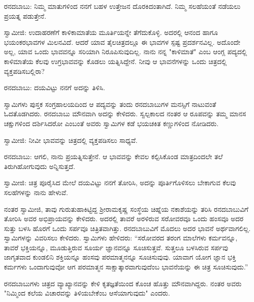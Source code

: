 ರನದಬಾಬು: ನಿಮ್ಮ ಮಾತುಗಳಿಂದ ನನಗೆ ಬಹಳ ಉತ್ತೇಜನ ದೊರಕಿದಂತಾಗಿದೆ. ನಿಮ್ಮ ಸಲಹೆಯಂತೆ ನಡೆಯಲು ಪ್ರಯತ್ನ ಪಡುತ್ತೇನೆ.

ಸ್ವಾಮೀಜಿ: ಉದಾಹರಣೆಗೆ ಕಾಳಿಕಾಮಾತೆಯ ಮೂರ್ತಿಯನ್ನೇ ತೆಗೆದುಕೊಳ್ಳಿ. ಅದರಲ್ಲಿ ಆನಂದ ಹಾಗೂ ಭಯಂಕರಭಾವಗಳ ಮಿಲನವಿದೆ. ಆದರೆ ಯಾವ ತೈಲಚಿತ್ರದಲ್ಲೂ ಈ ಭಾವಗಳ ಸ್ಪಷ್ಟ ಪ್ರದರ್ಶನವಿಲ್ಲ. ಅದೊಂದೇ ಅಲ್ಲ, ಯಾವ ಒಂದು ಭಾವವನ್ನೂ ಸರಿಯಾಗಿ ನಿರೂಪಿಸುವುದಿಲ್ಲ. ನಾನು ನನ್ನ "ಕಾಳಿಮಾತೆ" ಎಂಬ ಆಂಗ್ಲ ಪದ್ಯದಲ್ಲಿ ಕಾಳಿಮಾತೆಯ ಕೆಲವು ಉಗ್ರಭಾವವನ್ನು ಕೊಡಲು ಯತ್ನಿಸಿದ್ದೇನೆ. ನೀವು ಆ ಭಾವನೆಗಳನ್ನು ಒಂದು ಚಿತ್ರದಲ್ಲಿ ವ್ಯಕ್ತಪಡಿಸಬಲ್ಲಿರಾ?

ರನದಬಾಬು: ದಯವಿಟ್ಟು ನನಗೆ ಅದನ್ನು ತಿಳಿಸಿ.

ಸ್ವಾಮಿಗಳು ಪುಸ್ತಕ ಸಂಗ್ರಹಾಲಯದಿಂದ ಆ ಪದ್ಯವನ್ನು ತಂದು ರನದಬಾಬುಗಳ ಮನಸ್ಸಿಗೆ ನಾಟುವಂತೆ ಓದತೊಡಗಿದರು. ರನದಬಾಬು ಮೌನವಾಗಿ ಅದನ್ನು ಕೇಳಿದರು. ಸ್ವಲ್ಪಕಾಲದ ನಂತರ ಆ ರೂಪವನ್ನು ತಮ್ಮ ಮಾನಸ ಚಕ್ಷುಗಳಿಂದ ದರ್ಶಿಸಿದರೋ ಎಂಬಂತೆ ಅವರು ಸ್ವಾಮಿಗಳ ಕಡೆ ಭಯಚಕಿತ ಕಣ್ಣುಗಳಿಂದ ನೋಡಿದರು.

ಸ್ವಾಮೀಜಿ: ನೀವೀ ಭಾವವನ್ನು ಚಿತ್ರದಲ್ಲಿ ವ್ಯಕ್ತಪಡಿಸಲು ಸಾಧ್ಯವೆ.

ರನದಬಾಬು: ಆಗಲಿ, ನಾನು ಪ್ರಯತ್ನಿಸುತ್ತೇನೆ. ಆ ಭಾವವನ್ನು ಕೇವಲ ಕಲ್ಪಿಸಿಕೊಂಡ ಮಾತ್ರದಿಂದಲೇ ತಲೆ ತಿರುಗಿಹೋಗುವುದು ಅನ್ನಿಸುತ್ತದೆ.

ಸ್ವಾಮೀಜಿ: ಚಿತ್ರ ಪೂರೈಸಿದ ಮೇಲೆ ದಯವಿಟ್ಟು ನನಗೆ ತೋರಿಸಿ, ಅದನ್ನು ಪೂರ್ತಿಗೊಳಿಸಲು ಬೇಕಾಗುವ ಕೆಲವು ಸಲಹೆಗಳನ್ನು ನಾನು ಹೇಳುವೆ.

ನಂತರ ಸ್ವಾಮೀಜಿ, ತಾವು ಗುರುತುಹಾಕಿಟ್ಟಿದ್ದ ಶ‍್ರೀರಾಮಕೃಷ್ಣ ಸಂಸ್ಥೆಯ ಚಿಹ್ನೆಯ ನಕಾಶೆಯನ್ನು ತರಿಸಿ ರನದಬಾಬುವಿಗೆ ತೋರಿಸಿ ಅವರ ಅಭಿಪ್ರಾಯವನ್ನು ಕೇಳಿದರು. ಅದರಲ್ಲಿ ತಾವರೆ ಅರಳಿರುವ ಸರೋವರವೂ ಒಂದು ಹಂಸವೂ ಅದರ ಸುತ್ತು ಬಳಸಿ ಹೊರಗೆ ಒಂದು ಸರ್ಪವೂ ಚಿತ್ರಿತವಾಗಿತ್ತು. ರನದಬಾಬುವಿಗೆ ಮೊದಲು ಅದರ ಭಾವನೆ ಅರ್ಥವಾಗಲಿಲ್ಲ. ಸ್ವಾಮಿಗಳನ್ನು ವಿವರಿಸಲು ಕೇಳಿದರು. ಸ್ವಾಮಿಗಳು ಹೇಳಿದರು: “ಸರೋವರದ ತರಂಗ ಮಾಲೆಗಳು ಕರ್ಮವನ್ನೂ, ತಾವರೆ ಭಕ್ತಿಯನ್ನೂ, ಮೂಡುತ್ತಿರುವ ಸೂರ್ಯ ಜ್ಞಾನವನ್ನೂ ಸೂಚಿಸುತ್ತವೆ. ಸುತ್ತಲೂ ಬಳಸಿರುವ ಸರ್ಪವು ಜಾಗೃತವಾದ ಕುಂಡಲಿನಿ ಶಕ್ತಿಯನ್ನೂ ಹಂಸವು ಪರಮಾತ್ಮನನ್ನೂ ಸೂಚಿಸುವುವು. ಯಾವಾಗ ಯೋಗ ಜ್ಞಾನ ಭಕ್ತಿ ಕರ್ಮಗಳು ಒಂದಾಗುವುವೋ ಆಗ ಪರಮಾತ್ಮನ ಸಾಕ್ಷಾತ್ಕಾರವಾಗುವುದೆಂಬ ಭಾವನೆಯನ್ನು ಈ ಚಿತ್ರ ಸೂಚಿಸುವುದು.”

ರನದಬಾಬುಗಳು ಚಿತ್ರದ ವ್ಯಾಖ್ಯಾನವನ್ನು ಕೇಳಿ ಕೃತಜ್ಞತೆಯಿಂದ ಕೊಂಚ ಹೊತ್ತು ಮೌನವಾಗಿದ್ದರು. ನಂತರ ಅವರು "ನಿಮ್ಮಿಂದ ಕಲೆಯ ವಿಚಾರವನ್ನು ತಿಳಿಯಬೇಕೆಂಬ ಆಸೆಯಾಗುವುದು" ಎಂದರು.

